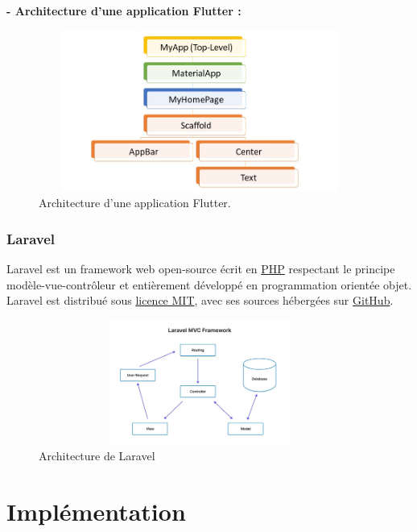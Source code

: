 \textbf {- Architecture d’une application Flutter :} \newline \newline \newline
\begin{figure}[h!]
	\includegraphics[width=400px,height=200px]{./Template LaTeX/Images/Flutter_architect.png}
	\caption{Architecture d’une application Flutter.}
	\label{fig:birds}
\end{figure}
\subsubsection{Laravel}
Laravel est un framework web open-source écrit en  \href{https://fr.wikipedia.org/wiki/PHP}{PHP} respectant le principe modèle-vue-contrôleur et entièrement développé en programmation orientée objet. Laravel est distribué sous \href{https://fr.wikipedia.org/wiki/Licence_MIT}{licence MIT}, avec ses sources hébergées sur 
\href{https://fr.wikipedia.org/wiki/GitHub}{GitHub}.
\begin{figure}[h!]
	\includegraphics[width=400px,height=155px]{./Template LaTeX/Images/Laravel-MVC-framework.jpg}
	\caption{Architecture de Laravel}
	\label{fig:birds}
\end{figure}
\newpage
\section{Implémentation}
